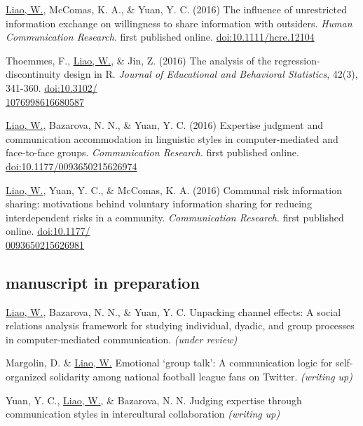 \documentclass[11pt, letterpaper]{article} %
\newcommand{\years}[1]{\leavevmode\marginnote{\scriptsize #1}} %
\begin{document}
\begin{hangparas}{.25in}{1}
\underline{Liao, W.}, \years{2016}  McComas, K. A., \& Yuan, Y. C. (2016) The influence of unrestricted information exchange on willingness to share information with outsiders. \textsl{Human Communication Research}. first published online. \href{http://doi.org/10.1111/hcre.12104}{doi:10.1111/hcre.12104} 

    Thoemmes, F., \underline{Liao, W.}, \& Jin, Z. (2016) The analysis of the regression-discontinuity design in R. \textsl{Journal of Educational and Behavioral Statistics}, 42(3), 341-360. \href{http://doi.org/10.3102/1076998616680587}{doi:10.3102/\\1076998616680587}

    \underline{Liao, W.}, Bazarova, N. N., \& Yuan, Y. C. (2016) Expertise judgment and communication accommodation in linguistic styles in computer-mediated and face-to-face groups. \textsl{Communication Research}. first published online. \href{http://doi.org/10.1177/0093650215626974}{doi:10.1177/0093650215626974}

    \underline{Liao, W.}, Yuan, Y. C., \& McComas, K. A. (2016) Communal risk information sharing: motivations behind voluntary information sharing for reducing interdependent risks in a community. \textsl{Communication Research}. first published online. \href{http://doi.org/10.1177/0093650215626981}{doi:10.1177/\\0093650215626981}
\end{hangparas}


\subsection*{manuscript in preparation}

\begin{hangparas}{.25in}{1}

\underline{Liao, W.}, Bazarova, N. N., \& Yuan, Y. C. Unpacking channel effects: A social relations analysis framework for studying individual, dyadic, and group processes in computer-mediated communication. \textsl{(under review)}

Margolin, D. \& \underline{Liao, W.} Emotional ‘group talk’: A communication logic for self-organized solidarity among national football league fans on Twitter. \textsl{(writing up)}

Yuan, Y. C., \underline{Liao, W.}, \& Bazarova, N. N. Judging expertise through communication styles in intercultural collaboration \textsl{(writing up)}

\end{hangparas}
\end{document}
